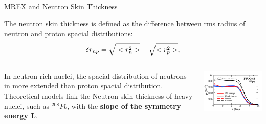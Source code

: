 \documentclass[9pt,a4paper]{beamer}
\begin{document}
\begin{frame}{MREX and Neutron Skin Thickness}

\begin{definition}
The neutron skin thickness is defined as the difference between rms radius of neutron and proton spacial distributions:
\begin{equation}
\delta r_{np} = \sqrt{\vphantom{r^{2}_{p}}<r^{2}_{n}>} - \sqrt{<r^{2}_{p}>} ,
\end{equation}
\end{definition}

\begin{columns}[T]
\begin{column}{.5\textwidth}
In neutron rich nuclei, the spacial distribution of neutrons in more extended than proton spacial distribution.
Theoretical models link the Neutron skin thickness of heavy nuclei, such as $^{208}Pb$, with the \textbf{slope of the symmetry energy L}.
\end{column}
\begin{column}{.5\textwidth}
\centering
\includegraphics[width = 1\textwidth]{figures/SpacialDistribution.png}
\end{column}
\end{columns}
\end{frame}
\end{document}
